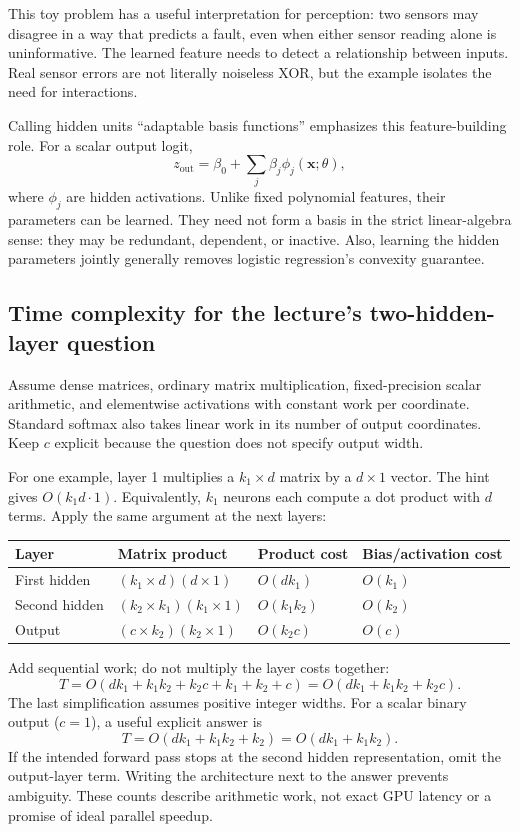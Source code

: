 This toy problem has a useful interpretation for perception: two sensors may disagree in a way that predicts a fault, even when either sensor reading alone is uninformative. The learned feature needs to detect a relationship between inputs. Real sensor errors are not literally noiseless XOR, but the example isolates the need for interactions.

Calling hidden units ``adaptable basis functions'' emphasizes this feature-building role. For a scalar output logit,
\[
 z_{\mathrm{out}}=\beta_0+\sum_j\beta_j\phi_j(\mathbf{x};\theta),
\]
where $\phi_j$ are hidden activations. Unlike fixed polynomial features, their parameters can be learned. They need not form a basis in the strict linear-algebra sense: they may be redundant, dependent, or inactive. Also, learning the hidden parameters jointly generally removes logistic regression's convexity guarantee.

\subsection{Time complexity for the lecture's two-hidden-layer question}
Assume dense matrices, ordinary matrix multiplication, fixed-precision scalar arithmetic, and elementwise activations with constant work per coordinate. Standard softmax also takes linear work in its number of output coordinates. Keep $c$ explicit because the question does not specify output width.

For one example, layer 1 multiplies a $k_1\times d$ matrix by a $d\times1$ vector. The hint gives $O(k_1d\cdot1)$. Equivalently, $k_1$ neurons each compute a dot product with $d$ terms. Apply the same argument at the next layers:
\begin{center}
\begin{tabular}{llll}
\toprule
Layer & Matrix product & Product cost & Bias/activation cost\\
\midrule
First hidden & $(k_1\times d)(d\times1)$ & $O(dk_1)$ & $O(k_1)$\\
Second hidden & $(k_2\times k_1)(k_1\times1)$ & $O(k_1k_2)$ & $O(k_2)$\\
Output & $(c\times k_2)(k_2\times1)$ & $O(k_2c)$ & $O(c)$\\
\bottomrule
\end{tabular}
\end{center}
Add sequential work; do not multiply the layer costs together:
\[
 T=O(dk_1+k_1k_2+k_2c+k_1+k_2+c)
   =\boxed{O(dk_1+k_1k_2+k_2c)}.
\]
The last simplification assumes positive integer widths. For a scalar binary output ($c=1$), a useful explicit answer is
\[
 \boxed{T=O(dk_1+k_1k_2+k_2)=O(dk_1+k_1k_2).}
\]
If the intended forward pass stops at the second hidden representation, omit the output-layer term. Writing the architecture next to the answer prevents ambiguity. These counts describe arithmetic work, not exact GPU latency or a promise of ideal parallel speedup.

